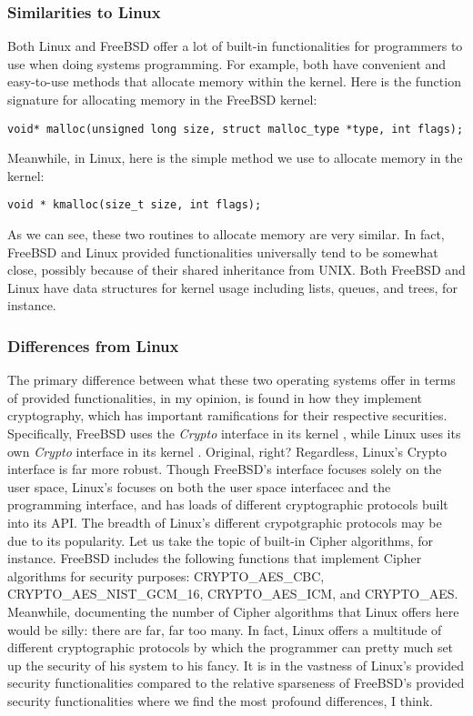 \documentclass[letterpaper,10pt,titlepage]{article}
\begin{document}
\subsubsection{Similarities to Linux}
Both Linux and FreeBSD offer a lot of built-in functionalities for programmers to use when doing systems programming. For example, both have convenient and easy-to-use methods that allocate memory within the kernel. Here is the function signature for allocating memory in the FreeBSD kernel:
\begin{lstlisting}
void* malloc(unsigned long size, struct malloc_type *type, int flags);
\end{lstlisting}
Meanwhile, in Linux, here is the simple method we use to allocate memory in the kernel: \cite{linux}
\begin{lstlisting}
void * kmalloc(size_t size, int flags);
\end{lstlisting}
As we can see, these two routines to allocate memory are very similar. In fact, FreeBSD and Linux provided functionalities universally tend to be somewhat close, possibly because of their shared inheritance from UNIX. Both FreeBSD and Linux have data structures for kernel usage including lists, queues, and trees, for instance. 
\subsubsection{Differences from Linux}
The primary difference between what these two operating systems offer in terms of provided functionalities, in my opinion, is found in how they implement cryptography, which has important ramifications for their respective securities. Specifically, FreeBSD uses the \emph{Crypto} interface in its kernel \cite{freeBSD2}, while Linux uses its own \emph{Crypto} interface in its kernel \cite{linux}. Original, right? Regardless, Linux's Crypto interface is far more robust. Though FreeBSD's interface focuses solely on the user space, Linux's focuses on both the user space interfacec and the programming interface, and has loads of different cryptographic protocols built into its API. The breadth of Linux's different crypotgraphic protocols may be due to its popularity. Let us take the topic of built-in Cipher algorithms, for instance. FreeBSD includes the following functions that implement Cipher algorithms for security purposes: CRYPTO\_AES\_CBC, CRYPTO\_AES\_NIST\_GCM\_16, CRYPTO\_AES\_ICM, and CRYPTO\_AES. Meanwhile, documenting the number of Cipher algorithms that Linux offers here would be silly: there are far, far too many. In fact, Linux offers a multitude of different cryptographic protocols by which the programmer can pretty much set up the security of his system to his fancy. It is in the vastness of Linux's provided security functionalities compared to the relative sparseness of FreeBSD's provided security functionalities where we find the most profound differences, I think. 

\newpage
{}

\end{document}
